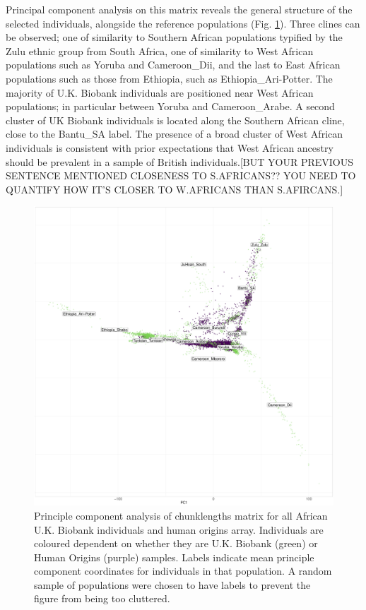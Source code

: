 {Principal component analysis on this matrix reveals the general structure of the selected individuals, alongside the reference populations (Fig. \ref{fig:PCA_chunklengths_HumanOrigins_U.K.Biobank}). Three clines can be observed; one of similarity to Southern African populations typified by the Zulu ethnic group from South Africa, one of similarity to West African populations such as Yoruba and Cameroon\_Dii, and the last to East African populations such as those from Ethiopia, such as Ethiopia\_Ari-Potter. The majority of U.K. Biobank individuals are positioned near West African populations; in particular between Yoruba and Cameroon\_Arabe. A second cluster of UK Biobank individuals is located along the Southern African cline, close to the Bantu\_SA label. {\color{red}The presence of a broad cluster of West African individuals is consistent with prior expectations that West African ancestry should be prevalent in a sample of British individuals.[BUT YOUR PREVIOUS SENTENCE MENTIONED CLOSENESS TO S.AFRICANS?? YOU NEED TO QUANTIFY HOW IT'S CLOSER TO W.AFRICANS THAN S.AFIRCANS.]}

\begin{figure}[htp]
    \centering
    \includegraphics[width=1.0\textwidth]{../images/chapter3/ChromoPainter_PCA_UKB_HO.pdf}
    \caption{Principle component analysis of chunklengths matrix for all African U.K. Biobank individuals and human origins array. Individuals are coloured dependent on whether they are U.K. Biobank (green) or Human Origins (purple) samples. Labels indicate mean principle component coordinates for individuals in that population. A random sample of populations were chosen to have labels to prevent the figure from being too cluttered.}
    \label{fig:PCA_chunklengths_HumanOrigins_U.K.Biobank}
\end{figure}

}
